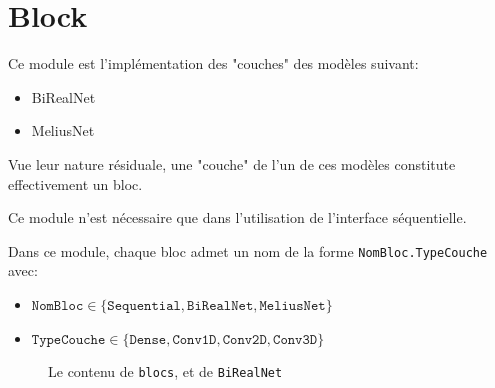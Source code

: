\section{Block}
Ce module est l'implémentation des "couches" des modèles suivant:
\begin{itemize}
	\item BiRealNet
	\item MeliusNet
\end{itemize}
Vue leur nature résiduale, une "couche" de l'un de ces modèles constitute effectivement un bloc.
\begin{remark}
	Ce module n'est nécessaire que dans l'utilisation de l'interface séquentielle.
\end{remark}
Dans ce module, chaque bloc admet un nom de la forme \texttt{NomBloc.TypeCouche} avec:
\begin{itemize}
	\item $\texttt{NomBloc} \in \{\texttt{Sequential},\texttt{BiRealNet},\texttt{MeliusNet}\}$
	\item $\texttt{TypeCouche} \in \{\texttt{Dense},\texttt{Conv1D},\texttt{Conv2D},\texttt{Conv3D}\}$
\end{itemize} 

\begin{figure}[htp]
\caption{Le contenu de \texttt{blocs}, et de \texttt{BiRealNet}}
\end{figure}
\FloatBarrier

